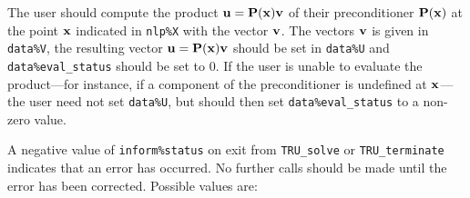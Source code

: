 \documentclass{galahad}
\newcommand{\packagename}{TRU}
\begin{document}
\begin{description}
 The user should compute the product ${\mathbf{u}} = {\mathbf{P}}({\mathbf{x}}){\mathbf{v}}$
     of their preconditioner ${\mathbf{P}}({\mathbf{x}})$ at the point ${\mathbf{x}}$
     indicated in {\tt nlp\%X} with the vector ${\mathbf{v}}$.
     The vectors ${\mathbf{v}}$ is given in {\tt data\%V}, the
     resulting vector ${\mathbf{u}} = {\mathbf{P}}({\mathbf{x}}){\mathbf{v}}$ should be set in {\tt data\%U}
     and {\tt data\%eval\_status}
     should be set to 0. If the user is unable to evaluate the product---for
     instance, if a component of the preconditioner is undefined at
     ${\mathbf{x}}$---the user need not set {\tt data\%U}, but should then set
     {\tt data\%eval\_status} to a non-zero value.

\end{description}



\galerrors
A negative value of {\tt inform\%status} on exit from
{\tt \packagename\_solve}
or
{\tt \packagename\_terminate}
indicates that an error has occurred. No further calls should be made
until the error has been corrected. Possible values are:
\end{document}
